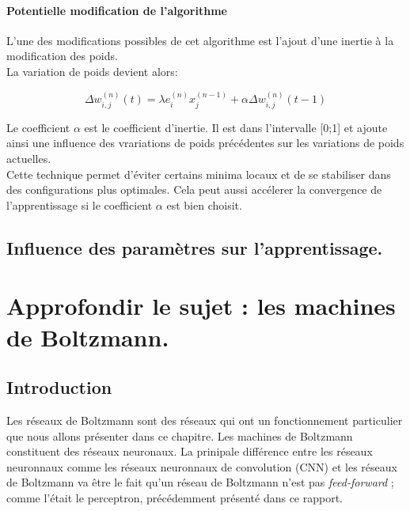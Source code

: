 \documentclass[a4paper,oneside]{report}
\begin{document}
                \subsection{Potentielle modification de l'algorithme}

                    L'une des modifications possibles de cet algorithme est l'ajout d'une inertie à la modification des poids.\\

                    La variation de poids devient alors:

                    \begin{equation}
                        \Delta w_{i,j}^{(n)}(t) = \lambda e_{i}^{(n)}x_{j}^{(n-1)} + \alpha \Delta w_{i,j}^{(n)}(t-1)
                    \end{equation}

                    Le coefficient $\alpha$ est le coefficient d'inertie. Il est dans l'intervalle [0;1] et ajoute ainsi une influence des vrariations de poids précédentes sur les variations de poids actuelles.\\

                    Cette technique permet d'éviter certains minima locaux et de se stabiliser dans des configurations plus optimales. Cela peut aussi accélerer la convergence de l'apprentissage si le coefficient $\alpha$ est bien choisit.


        \chapter{Influence des paramètres sur l'apprentissage.}




    \part[Machines de Boltzmann]{Approfondir le sujet : les machines de Boltzmann.}

        \chapter{Introduction}

            Les réseaux de Boltzmann sont des réseaux qui ont un fonctionnement
            particulier que nous allons présenter dans ce chapitre. Les machines de
            Boltzmann constituent des réseaux neuronaux. La prinipale différence entre
            les réseaux neuronnaux comme les réseaux neuronnaux de convolution (CNN) et
            les  réseaux de Boltzmann va être le fait qu'un réseau de Boltzmann n'est
            pas \textit{feed-forward} ; comme l'était le perceptron, précédemment présenté dans ce
            rapport.
\end{document}
